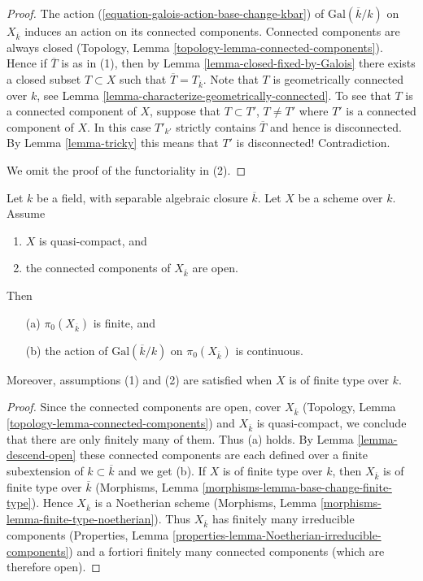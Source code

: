 \begin{proof}
The action (\ref{equation-galois-action-base-change-kbar})
of $\text{Gal}(\overline{k}/k)$ on $X_{\overline{k}}$
induces an action on its connected components.
Connected components are always closed
(Topology, Lemma \ref{topology-lemma-connected-components}).
Hence if $\overline{T}$ is as in (1), then by
Lemma \ref{lemma-closed-fixed-by-Galois} there exists a closed
subset $T \subset X$ such that $\overline{T} = T_{\overline{k}}$.
Note that $T$ is geometrically connected over $k$, see
Lemma \ref{lemma-characterize-geometrically-connected}.
To see that $T$ is a connected component of $X$, suppose that
$T \subset T'$, $T \not = T'$ where $T'$ is a connected component of $X$.
In this case $T'_{k'}$ strictly contains $\overline{T}$ and hence is
disconnected. By Lemma \ref{lemma-tricky} this means that $T'$ is
disconnected! Contradiction.

\medskip\noindent
We omit the proof of the functoriality in (2).
\end{proof}

\begin{lemma}
\label{lemma-galois-action-connected-components-continuous}
Let $k$ be a field, with separable algebraic closure $\overline{k}$.
Let $X$ be a scheme over $k$.
Assume
\begin{enumerate}
\item $X$ is quasi-compact, and
\item the connected components of $X_{\overline{k}}$ are open.
\end{enumerate}
Then
\begin{enumerate}
\item[(a)] $\pi_0(X_{\overline{k}})$ is finite, and
\item[(b)] the action of $\text{Gal}(\overline{k}/k)$ on
$\pi_0(X_{\overline{k}})$ is continuous.
\end{enumerate}
Moreover, assumptions (1) and (2) are satisfied when $X$ is
of finite type over $k$.
\end{lemma}

\begin{proof}
Since the connected components are open, cover $X_{\overline{k}}$
(Topology, Lemma \ref{topology-lemma-connected-components}) and
$X_{\overline{k}}$ is quasi-compact, we conclude that there are only
finitely many of them. Thus (a) holds.
By Lemma \ref{lemma-descend-open} these connected components
are each defined over a finite subextension of $k \subset \overline{k}$
and we get (b).
If $X$ is of finite type over $k$, then $X_{\overline{k}}$ is of finite
type over $\overline{k}$
(Morphisms, Lemma \ref{morphisms-lemma-base-change-finite-type}).
Hence $X_{\overline{k}}$ is a Noetherian scheme
(Morphisms, Lemma \ref{morphisms-lemma-finite-type-noetherian}).
Thus $X_{\overline{k}}$ has finitely many irreducible components
(Properties, Lemma \ref{properties-lemma-Noetherian-irreducible-components})
and a fortiori finitely many connected components (which are
therefore open).
\end{proof}









